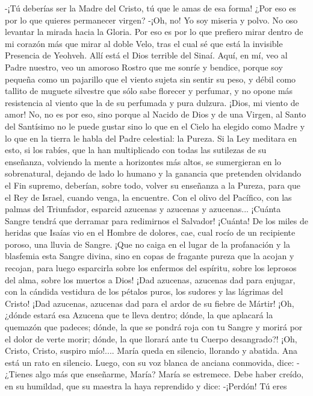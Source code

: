 \documentclass[12pt]{book} %
\begin{document}
-¡Tú deberías ser la Madre del Cristo, tú que le amas de esa forma! ¿Por eso es por lo que quieres permanecer virgen? 
-¡Oh, no! Yo soy miseria y polvo. No oso levantar la mirada hacia la Gloria. Por eso es por lo que prefiero mirar dentro 
de mi corazón más que mirar al doble Velo, tras el cual sé que está la invisible Presencia de Yeohveh. Allí está el Dios terrible del Sinaí. Aquí, en mí, veo al Padre nuestro, veo un amoroso Rostro que me sonríe y bendice, porque soy pequeña como un pajarillo que el viento sujeta sin sentir su peso, y débil como tallito de muguete silvestre que sólo sabe florecer y perfumar, y no opone más resistencia al viento que la de su perfumada y pura dulzura. ¡Dios, mi viento de amor! No, no es por eso, sino porque al Nacido de Dios y de una Virgen, al Santo del Santísimo no le puede gustar sino lo que en el Cielo ha elegido como Madre y lo que en la tierra le habla del Padre celestial: la Pureza. Si la Ley meditara en esto, si los rabíes, que la han multiplicado con todas las sutilezas de su enseñanza, volviendo la mente a horizontes más altos, se sumergieran en lo sobrenatural, dejando de lado lo humano y la ganancia que pretenden olvidando el Fin supremo, deberían, sobre todo, volver su enseñanza a la Pureza, para que el Rey de Israel, cuando venga, la encuentre. Con el olivo del Pacífico, con las palmas del Triunfador, esparcid azucenas y azucenas y azucenas... ¡Cuánta Sangre tendrá que derramar para redimirnos el Salvador! ¡Cuánta! De los miles de heridas que Isaías vio en el Hombre de dolores, cae, cual rocío de un recipiente poroso, una lluvia de Sangre. ¡Que no caiga en el lugar de la profanación y la blasfemia esta Sangre divina, sino en copas de fragante pureza que la acojan y recojan, para luego esparcirla sobre los enfermos del espíritu, sobre los leprosos del alma, sobre los muertos a Dios! ¡Dad azucenas, azucenas dad para enjugar, con la cándida vestidura de los pétalos puros, los sudores y las lágrimas del Cristo! ¡Dad azucenas, azucenas dad para el ardor de su fiebre de Mártir! ¡Oh, ¿dónde estará esa Azucena que te lleva dentro; dónde, la que aplacará la quemazón que padeces; dónde, la que se pondrá roja con tu Sangre y morirá por el dolor de verte morir; dónde, la que llorará ante tu Cuerpo desangrado?! ¡Oh, Cristo, Cristo, suspiro mío!.... 
María queda en silencio, llorando y abatida. 
Ana está un rato en silencio. Luego, con su voz blanca de anciana conmovida, dice: 
-¿Tienes algo más que enseñarme, María? 
María se estremece. Debe haber creído, en su humildad, que su maestra la haya reprendido y dice: -¡Perdón! Tú eres 
\end{document}
